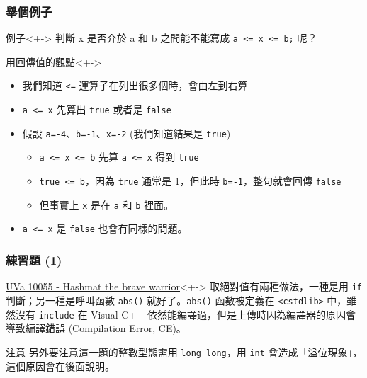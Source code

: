 \documentclass[utf8]{beamer}
\begin{document}
\begin{CJK}{UTF8}{bkai}
\begin{frame}[fragile]
  \frametitle{舉個例子}
  \begin{block}{例子}<+->
  判斷 x 是否介於 a 和 b 之間能不能寫成 \lstinline{a <= x <= b;}{} 呢？
  \end{block}
  \begin{exampleblock}{用回傳值的觀點}<+->
    \begin{itemize}
    \item 我們知道 \lstinline{<=}{} 運算子在列出很多個時，會\alert{由左到右算}
    \item<+-> \alert{\lstinline{a <= x}{}} 先算出 \lstinline{true}{} 或者是 \lstinline{false}{}
    \item<+-> 假設 \lstinline{a=-4}{}、\lstinline{b=-1}{}、\lstinline{x=-2}{} (我們知道結果是 \lstinline{true}{})
      \begin{itemize}[<+->]
      \item \lstinline{a <= x <= b}{} 先算 \lstinline{a <= x}{} 得到 \lstinline{true}{}
      \item \lstinline{true <= b}{}，因為 \lstinline{true}{} 通常是 1，但此時 \lstinline{b=-1}{}，整句就會回傳 \lstinline{false}{}
      \item 但事實上 \lstinline{x}{} 是在 \lstinline{a}{} 和 \lstinline{b}{} 裡面。
      \end{itemize}
    \item<+-> \lstinline{a <= x}{} 是 \lstinline{false}{} 也會有同樣的問題。
    \end{itemize}
  \end{exampleblock}
\end{frame}

\begin{frame}[fragile]
  \frametitle{練習題 (1)}
  \begin{exampleblock}{\href{http://unfortunate-dog.github.io/articles/100/p10055/}{UVa 10055 - Hashmat the brave warrior}}<+->
  \label{uva:10055}
  取絕對值有兩種做法，一種是用 \lstinline{if}{} 判斷；另一種是呼叫函數 \lstinline{abs()}{} 就好了。\lstinline{abs()}{} 函數被定義在 \lstinline{<cstdlib>}{} 中，雖然沒有 \lstinline{include}{} 在 Visual C++ 依然能編譯過，但是上傳時因為編譯器的原因會導致\alert{編譯錯誤} (Compilation Error, CE)。
  \end{exampleblock}
  \begin{alertblock}{注意}
  另外要注意這一題的整數型態需用 \lstinline{long long}{}，用 \lstinline{int}{} 會造成「溢位現象」，這個原因會在後面說明。
  \end{alertblock}
\end{frame}


\end{CJK}
\end{document}
